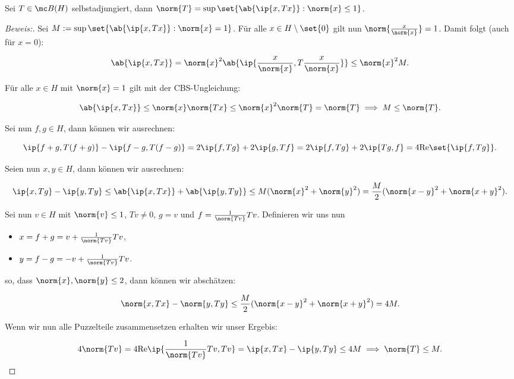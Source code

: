 \begin{theorem}
	
	Sei $T \in \mc B(H)$ selbstadjungiert, dann $\norm{T} = \sup{\set{\ab{\ip{x, Tx}}: \norm{x} \leq 1}}$.
	
	\begin{proof}[Beweis:]
		
		Sei $M := \sup{\set{\ab{\ip{x, Tx}}: \norm{x} = 1}}$. Für alle $x \in H \setminus \set{0}$ gilt nun $\norm{\frac{x}{\norm{x}}} = 1$. Damit folgt (auch für $x = 0$):
		
		\[ \ab{\ip{x, Tx}} = \norm{x}^2 \ab{\ip{\frac{x}{\norm{x}}, T \frac{x}{\norm{x}}}} \leq \norm{x}^2 M. \]
		
		
		Für alle $x \in H$ mit $\norm{x} = 1$ gilt mit der CBS-Ungleichung:
		
		\[ \ab{\ip{x, Tx}} \leq \norm{x} \norm{Tx} \leq \norm{x}^2 \norm{T} = \norm{T} \implies M \leq \norm{T}. \]
		
		Sei nun $f, g \in H$, dann können wir ausrechnen:
		
		\[ \ip{f+g, T(f+g)} - \ip{f-g, T(f-g)} = 2\ip{f, Tg} + 2\ip{g, Tf} = 2 \ip{f, Tg} + 2 \ip{Tg, f} = 4 \text{Re}\set{\ip{f, Tg}}. \]
		
		Seien nun $x, y \in H$, dann können wir ausrechnen:
		
		\[ \ip{x, Tg} - \ip{y, Ty} \leq \ab{\ip{x, Tx}} + \ab{\ip{y, Ty}} \leq M (\norm{x}^2 + \norm{y}^2) = \frac{M}{2} (\norm{x-y}^2 + \norm{x+y}^2). \]
		
		Sei nun $v \in H$ mit $\norm{v} \leq 1$, $Tv \not= 0$, $g = v$ und $f = \frac{1}{\norm{Tv}}Tv$. Definieren wir uns nun
		
		\begin{itemize}
			
			\item $x = f+g = v + \frac{1}{\norm{Tv}}Tv$,
			
			\item $y = f-g = -v + \frac{1}{\norm{Tv}}Tv$.
			
		\end{itemize}
		
		so, dass $\norm{x}, \norm{y} \leq 2$, dann können wir abschätzen:
		
		\[ \norm{x, Tx} - \norm{y, Ty} \leq \frac{M}{2} (\norm{x-y}^2 + \norm{x+y}^2) = 4M. \]
		
		Wenn wir nun alle Puzzelteile zusammensetzen erhalten wir unser Ergebis:
		
		\[ 4 \norm{Tv} = 4 \text{Re}\ip{\frac{1}{\norm{Tv}}Tv, Tv} = \ip{x, Tx} - \ip{y, Ty} \leq 4M \implies \norm{T} \leq M. \]
		
	\end{proof}
	
\end{theorem}


